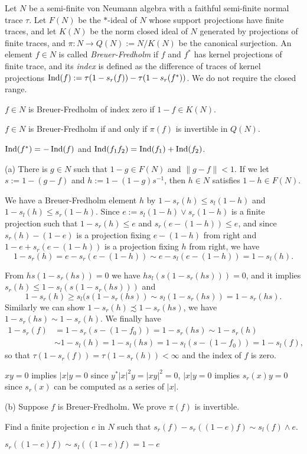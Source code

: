 \documentclass{../../large}
\begin{document}
\begin{prb}
Let $N$ be a semi-finite von Neumann algebra with a faithful semi-finite normal trace $\tau$.
Let $F(N)$ be the $*$-ideal of $N$ whose support projections have finite traces, and let $K(N)$ be the norm closed ideal of $N$ generated by projections of finite traces, and $\pi:N\to Q(N):=N/K(N)$ be the canonical surjection.
An element $f\in N$ is called \emph{Breuer-Fredholm} if $f$ and $f^*$ has kernel projections of finite trace, and its \emph{index} is defined as the difference of traces of kernel projections $\operatorname{Ind}(f):=\tau(1-s_r(f))-\tau(1-s_r(f^*))$.
We do not require the closed range.
\begin{parts}
\item $f\in N$ is Breuer-Fredholm of index zero if $1-f\in K(N)$.
\item $f\in N$ is Breuer-Fredholm if and only if $\pi(f)$ is invertible in $Q(N)$.
\item $\operatorname{Ind}(f^*)=-\operatorname{Ind}(f)$ and $\operatorname{Ind}(f_1f_2)=\operatorname{Ind}(f_1)+\operatorname{Ind}(f_2)$.
\end{parts}
\end{prb}
\begin{pf}
(a)
There is $g\in N$ such that $1-g\in F(N)$ and $\|g-f\|<1$.
If we let $s:=1-(g-f)$ and $h:=1-(1-g)s^{-1}$, then $h\in N$ satisfies $1-h\in F(N)$.

We have a Breuer-Fredholm element $h$ by $1-s_r(h)\le s_l(1-h)$ and $1-s_l(h)\le s_r(1-h)$.
Since $e:=s_l(1-h)\vee s_r(1-h)$ is a finite projection such that $1-s_r(h)\le e$ and $s_r(e-(1-h))\le e$, and since $s_r(h)-(1-e)$ is a projection fixing $e-(1-h)$ from right and $1-e+s_r(e-(1-h))$ is a projection fixing $h$ from right, we have
\[1-s_r(h)=e-s_r(e-(1-h))\sim e-s_l(e-(1-h))=1-s_l(h).\]

From $hs(1-s_r(hs))=0$ we have $hs_l(s(1-s_r(hs)))=0$, and it implies $s_r(h)\le 1-s_l(s(1-s_r(hs)))$ and
\[1-s_r(h)\ge s_l(s(1-s_r(hs))\sim s_l(1-s_r(hs))=1-s_r(hs).\]
Similarly we can show $1-s_r(h)\precsim1-s_r(hs)$, we have $1-s_r(hs)\sim1-s_r(h)$.
We finally have
\begin{align*}
1-s_r(f)&=1-s_r(s-(1-f_0))=1-s_r(hs)\sim1-s_r(h)\\
&\sim1-s_l(h)=1-s_l(hs)=1-s_l(s-(1-f_0))=1-s_l(f),
\end{align*}
so that $\tau(1-s_r(f))=\tau(1-s_r(h))<\infty$ and the index of $f$ is zero.


$xy=0$ implies $|x|y=0$ since $y^*|x|^2y=|xy|^2=0$,
$|x|y=0$ implies $s_r(x)y=0$ since $s_r(x)$ can be computed as a series of $|x|$.



(b)
Suppose $f$ is Breuer-Fredholm.
We prove $\pi(f)$ is invertible.

Find a finite projection $e$ in $N$ such that $s_r(f)-s_r((1-e)f)\sim s_l(f)\wedge e$.

$s_r((1-e)f)\sim s_l((1-e)f)=1-e$
\end{pf}
\end{document}
